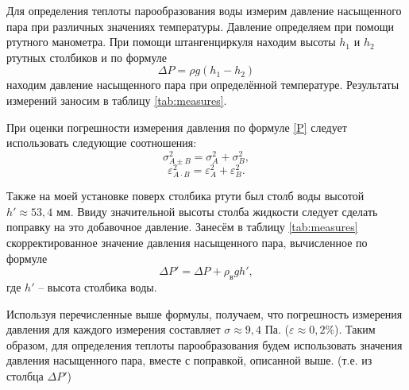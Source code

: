 \documentclass[a4paper,12pt]{article} %
\begin{document}
Для определения теплоты парообразования воды измерим давление насыщенного пара при различных значениях температуры. Давление определяем при помощи ртутного манометра. При помощи штангенциркуля находим высоты $ h_1 $ и $ h_2 $ ртутных столбиков и по формуле  \begin{equation}\label{P}
\Delta P = \rho g (h_1 - h_2)
\end{equation}  находим давление насыщенного пара при определённой температуре. Результаты измерений заносим в таблицу \ref{tab:measures}.

При оценки погрешности измерения давления по формуле \eqref{P} следует использовать следующие соотношения:
\[ \sigma^2_{A\pm B} = \sigma^2_A+\sigma^2_B, \]
\[ \varepsilon^2_{A\cdot B} = \varepsilon^2_A+\varepsilon^2_B. \]

Также на моей установке поверх столбика ртути был столб воды высотой $ h' \approx 53,4 $ мм. Ввиду значительной высоты столба жидкости следует сделать поправку на это добавочное давление. Занесём в таблицу \ref{tab:measures} скорректированное значение давления насыщенного пара, вычисленное по формуле \[ \Delta P' = \Delta P + \rho_\text{в}gh', \] где $ h' $ -- высота столбика воды.

Используя перечисленные выше формулы, получаем, что погрешность измерения давления для каждого измерения составляет $ \sigma \approx 9,4 $ Па. ($ \varepsilon \approx 0,2 \% $). Таким образом, для определения теплоты парообразования будем использовать значения давления насыщенного пара, вместе с поправкой, описанной выше. (т.е. из столбца $ \Delta P' $)
\end{document}
